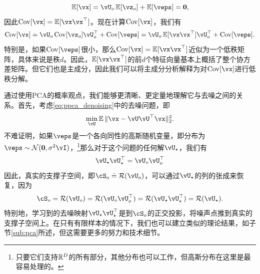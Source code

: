 \documentclass[../../book-main.tex]{subfiles}
\begin{document}
\begin{equation}
    \Ex[\vx] = \vU_{o}\Ex[\vz_{o}] + \Ex[\veps] = \vzero,
\end{equation}
因此\(\Cov[\vx] = \Ex[\vx\vx^{\top}]\)。现在计算\(\Cov[\vx]\)，我们有
\begin{equation}
    \Cov[\vx] = \vU_{o}\Cov[\vz_{o}]\vU_{o}^{\top} + \Cov[\veps] = \vU_{o}\Ex[\vx\vx^{\top}]\vU_{o}^{\top} + \Cov[\veps].
\end{equation}
特别是，如果\(\Cov[\veps]\)很小，那么\(\Cov[\vx] = \Ex[\vx\vx^{\top}]\)近似为一个低秩矩阵，具体来说是秩\(d\)。因此，\(\Ex[\vx\vx^{\top}]\)的前\(d\)个特征向量基本上概括了整个协方差矩阵。但它们也是主成分，因此我们可以将主成分分析解释为对\(\Cov[\vx]\)进行低秩分解。

\begin{remark}
    通过使用PCA的概率观点，我们能够更清晰、更定量地理解它与去噪之间的关系。首先，考虑\eqref{eq:ppca_denoising}中的去噪问题，即
    \begin{equation}
        \min_{\vU}\Ex\norm{\vx - \vU\vU^{\top}\vx}_{2}^{2}.
    \end{equation}
    不难证明，如果\(\veps\)是一个各向同性的高斯随机变量，即分布为\(\veps \sim \dNorm(\vzero, \sigma^{2}\vI)\)，\footnote{只要它们支持\(\mathbb{R}^{D}\)的所有部分，其他分布也可以工作，但高斯分布在这里是最容易处理的。}那么对于这个问题的任何解\(\vU_{\star}\)，我们有
    \begin{equation}
        \vU_{\star}\vU_{\star}^{\top} = \vU_{o}\vU_{o}^{\top}
    \end{equation}
    因此，真实的支撑子空间，即\(\cS_{o} \doteq \Range(\vU_{o})\)，可以通过\(\vU_{\star}\)的列的张成来恢复，因为
    \begin{equation}
        \cS_{o} = \Range(\vU_{o}) = \Range(\vU_{o}\vU_{o}^{\top}) = \Range(\vU_{\star}\vU_{\star}^{\top}) = \Range(\vU_{\star}).
    \end{equation}
    特别地，学习到的去噪映射\(\vU_{\star}\vU_{\star}^{\top}\)是到\(\cS_{o}\)的正交投影，将噪声点推到真实的支撑子空间上。在只有有限样本的情况下，我们也可以建立类似的理论结果，如子节\ref{sub:pca}所述，但这需要更多的努力和技术细节。%
\end{remark}


\end{document}
